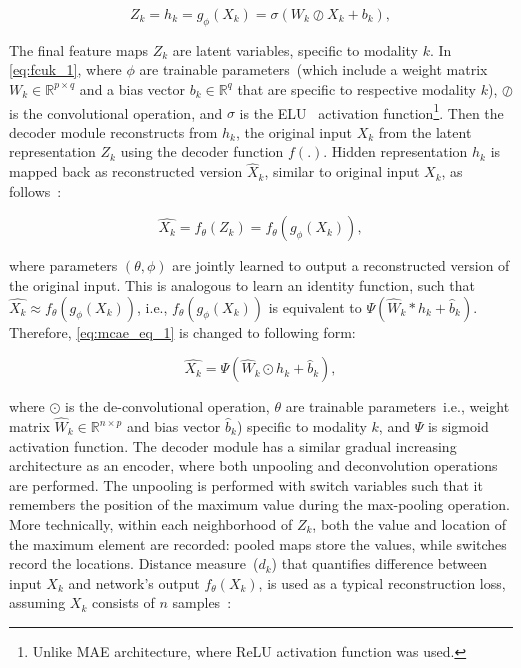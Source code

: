 \begin{equation}
    Z_k = h_{k}=g_\phi \left({X}_{k}\right)=\sigma\left(W_{k} \oslash X_{k}+b_{k}\right),
    \label{eq:fcuk_1}
\end{equation}

\hspace*{3.5mm} The final feature maps $Z_k$ are latent variables, specific to modality $k$. In \cref{eq:fcuk_1}, where $\phi$ are trainable parameters~(which include a weight matrix $W_{k} \in \mathbb{R}^{p \times q}$ and a bias vector $b_{k} \in \mathbb{R}^{q}$ that are specific to respective modality $k$), $\oslash$ is the convolutional operation, and $\sigma$ is the ELU~\cite{clevert2015fast} activation function\footnote{Unlike MAE architecture, where ReLU activation function was used.}. Then the decoder module reconstructs from $h_k$, the original input $X_{k}$ from the latent representation $Z_k$ using the decoder function $f(.)$. Hidden representation $h_{k}$ is mapped back as reconstructed version $\hat{X}_{k}$, similar to original input ${X}_{k}$, as follows~\cite{mmdcae}: 

\begin{equation}
    \hat{X_k}=f_{\theta}\left(Z_k\right)=f_{\theta}\left(g_{\phi}({X_k})\right) \label{eq:mcae_eq_1},
\end{equation}

\hspace*{3.5mm} where parameters $(\theta,\phi)$ are jointly learned to output a reconstructed version of the original input. This is analogous to learn an identity function, such that $\hat{X_k} \approx f_{\theta}\left(g_{\phi}({X_k})\right)$, i.e., $f_{\theta}\left(g_{\phi}({X_k})\right)$ is equivalent to $\Psi \left(\hat W_k * h_k + \hat b_{k}\right)$. Therefore,  \cref{eq:mcae_eq_1} is changed to following form: 

\begin{equation}
    \hat{X_k}=\Psi \left(\hat W_k \odot h_k + \hat b_{k}\right),
\end{equation}

\hspace*{3.5mm} where $\odot$ is the de-convolutional operation, $\theta$ are trainable parameters~i.e., weight matrix $\hat W_{k} \in \mathbb{R}^{n \times p}$ and bias vector $\hat b_{k}$) specific to modality $k$, and $\Psi$ is sigmoid activation function. The decoder module has a similar gradual increasing architecture as an encoder, where both unpooling and deconvolution operations are performed. The unpooling is performed with switch variables such that it remembers the position of the maximum value during the max-pooling operation. More technically, within each neighborhood of $Z_k$, both the value and location of the maximum element are recorded: pooled maps store the values, while switches record the locations. Distance measure~($d_{k}$) that quantifies difference between input $X_{k}$ and network's output $f_\theta(X_{k})$, is used as a typical reconstruction loss, assuming $X_k$ consists of $n$ samples~\cite{KarimIEEEAccess2019}: 

